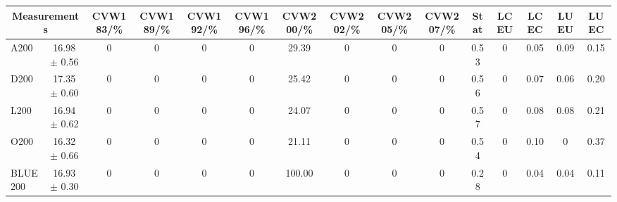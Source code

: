 \begin{table}[H]
\scriptsize
\begin{center}
\renewcommand{\arraystretch}{1.1}
\begin{tabular}{|lc|c|c|c|c|c|c|c|c|ccccc|}
\hline
\multicolumn{2}{|c|}{Measurements} & CVW{\tiny 183}/\%  & CVW{\tiny 189}/\%  & CVW{\tiny 192}/\%  & CVW{\tiny 196}/\%  & CVW{\tiny 200}/\%  & CVW{\tiny 202}/\%  & CVW{\tiny 205}/\%  & CVW{\tiny 207}/\%  & {\tiny Stat} & {\tiny LCEU} & {\tiny LCEC} & {\tiny LUEU} & {\tiny LUEC}\\
\hline
A200 &      16.98 $\pm$       0.56 &  0 &  0 &  0 &  0 &      29.39 &  0 &  0 &  0 &       0.53 &  0 &       0.05 &       0.09 &       0.15\\
D200 &      17.35 $\pm$       0.60 &  0 &  0 &  0 &  0 &      25.42 &  0 &  0 &  0 &       0.56 &  0 &       0.07 &       0.06 &       0.20\\
L200 &      16.94 $\pm$       0.62 &  0 &  0 &  0 &  0 &      24.07 &  0 &  0 &  0 &       0.57 &  0 &       0.08 &       0.08 &       0.21\\
O200 &      16.32 $\pm$       0.66 &  0 &  0 &  0 &  0 &      21.11 &  0 &  0 &  0 &       0.54 &  0 &       0.10 &  0 &       0.37\\
\hline
BLUE {\tiny 200} &      16.93 $\pm$       0.30 &  0 &  0 &  0 &  0 &     100.00 &  0 &  0 &  0 &       0.28 &  0 &       0.04 &       0.04 &       0.11\\
\hline
\end{tabular}
\renewcommand{\arraystretch}{1}
\end{center}
\end{table}
\vspace*{-0.5cm}
